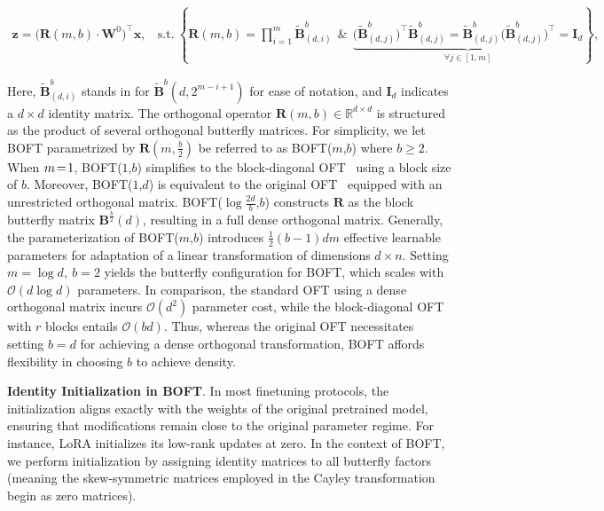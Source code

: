 \begin{equation}
    \begin{aligned}\nonumber
    \bm{z}=\big(\bm{R}(m,b)\cdot\bm{W}^0\big)^\top\bm{x},~~~~\text{s.t.}~\left\{\bm{R}(m,b)=\prod_{i=1}^m \tilde{\bm{B}}^b_{(d,i)}~~\&~~\underbrace{\big(\tilde{\bm{B}}^b_{(d,j)}\big)^\top\tilde{\bm{B}}^b_{(d,j)}=\tilde{\bm{B}}^b_{(d,j)}\big(\tilde{\bm{B}}^b_{(d,j)}\big)^\top\!=\bm{I}_d}_{\forall j\in [1, m]}\right\},
    \end{aligned}
\end{equation}

Here, $\tilde{\bm{B}}^b_{(d,i)}$ stands in for $\tilde{\bm{B}}^b(d,2^{m - i+1})$ for ease of notation, and $\bm{I}_d$ indicates a $d \times d$ identity matrix. The orthogonal operator $\bm{R}(m,b)\in\mathbb{R}^{d\times d}$ is structured as the product of several orthogonal butterfly matrices. For simplicity, we let BOFT parametrized by $\bm{R}(m,\frac{b}{2})$ be referred to as BOFT($m$,$b$) where $b\geq 2$. When $\thickmuskip=2mu \medmuskip=2mu m=1$, BOFT($1$,$b$) simplifies to the block-diagonal OFT~\cite{qiu2023controlling} using a block size of $b$. Moreover, BOFT($1$,$d$) is equivalent to the original OFT~\cite{qiu2023controlling} equipped with an unrestricted orthogonal matrix. BOFT($\log \frac{2d}{b}$,$b$) constructs $\bm{R}$ as the block butterfly matrix $\bm{B}^{\frac{b}{2}}(d)$, resulting in a full dense orthogonal matrix. Generally, the parameterization of BOFT($m$,$b$) introduces $\frac{1}{2}(b-1)dm$ effective learnable parameters for adaptation of a linear transformation of dimensions $d\times n$. Setting $m=\log d,~b=2$ yields the butterfly configuration for BOFT, which scales with $\mathcal{O}(d\log d)$ parameters. In comparison, the standard OFT using a dense orthogonal matrix incurs $\mathcal{O}(d^2)$ parameter cost, while the block-diagonal OFT with $r$ blocks entails $\mathcal{O}(bd)$. Thus, whereas the original OFT necessitates setting $b=d$ for achieving a dense orthogonal transformation, BOFT affords flexibility in choosing $b$ to achieve density.

\textbf{Identity Initialization in BOFT}. In most finetuning protocols, the initialization aligns exactly with the weights of the original pretrained model, ensuring that modifications remain close to the original parameter regime. For instance, LoRA initializes its low-rank updates at zero. In the context of BOFT, we perform initialization by assigning identity matrices to all butterfly factors (meaning the skew-symmetric matrices employed in the Cayley transformation begin as zero matrices).

